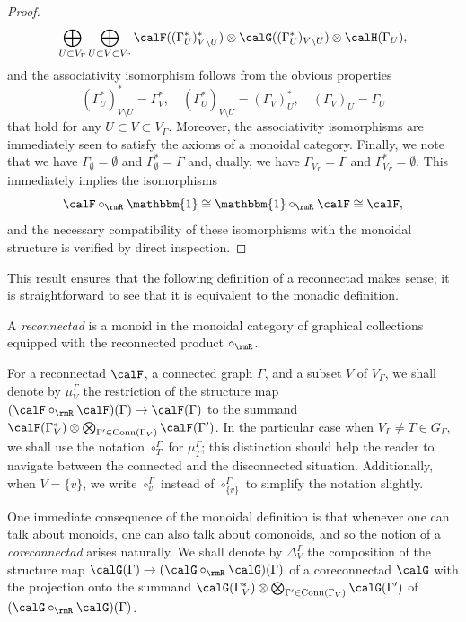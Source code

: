 \begin{proof}
 \[
\bigoplus_{U\subset V_\Gamma}\bigoplus_{U\subset V\subset V_\Gamma}
\calF((\Gamma^*_U)^*_{V\setminus U})\otimes\calG((\Gamma^*_U)_{V\setminus U})\otimes \calH(\Gamma_U), 
 \]
and the associativity isomorphism follows from the obvious properties 
 \[
(\Gamma^*_U)^*_{V\setminus U}=\Gamma^*_V, \quad (\Gamma^*_U)_{V\setminus U}=(\Gamma_V)^*_U, \quad (\Gamma_V)_U=\Gamma_U
 \]
that hold for any $U\subset V\subset V_\Gamma$. Moreover, the associativity isomorphisms are immediately seen to satisfy the axioms of a monoidal category. Finally, we note that we have $\Gamma_\emptyset=\emptyset$ and $\Gamma^*_\emptyset=\Gamma$ and, dually, we have $\Gamma_{V_\Gamma}=\Gamma$ and $\Gamma^*_{V_\Gamma}=\emptyset$. This immediately implies the isomorphisms 
 \[
\calF\circ_{\rmR}\mathbbm{1}\cong\mathbbm{1}\circ_{\rmR}\calF\cong\calF,
 \] 
and the necessary compatibility of these isomorphisms with the monoidal structure is verified by direct inspection. 
\end{proof}

This result ensures that the following definition of a reconnectad makes sense; it is straightforward to see that it is equivalent to the monadic definition.

\begin{defi}
A \emph{reconnectad} is a monoid in the monoidal category of graphical collections equipped with the reconnected product $\circ_{\rmR}$.
\end{defi}

For a reconnectad $\calF$, a connected graph $\Gamma$, and a subset $V$ of $V_\Gamma$, we shall denote by $\mu_V^\Gamma$ the restriction of the structure map $(\calF\circ_{\rmR}\calF)(\Gamma)\to \calF(\Gamma)$ to the summand $\calF(\Gamma^*_V)\otimes\bigotimes_{\Gamma'\in\mathrm{Conn}(\Gamma_V)} \calF(\Gamma')$. In the particular case when $V_\Gamma\ne T\in G_\Gamma$, we shall use the notation $\circ_T^\Gamma$ for $\mu_T^\Gamma$; this distinction should help the reader to navigate between the connected and the disconnected situation. Additionally, when $V=\{v\}$, we write $\circ_v^\Gamma$ instead of $\circ_{\{v\}}^\Gamma$ to simplify the notation slightly. 

One immediate consequence of the monoidal definition is that whenever one can talk about monoids, one can also talk about comonoids, and so the notion of a \emph{coreconnectad} arises naturally. We shall denote by $\Delta_V^\Gamma$ the composition of the structure map $\calG(\Gamma)\to (\calG\circ_{\rmR}\calG)(\Gamma)$ of a coreconnectad $\calG$ with the projection onto the summand $\calG(\Gamma^*_V)\otimes\bigotimes_{\Gamma'\in\mathrm{Conn}(\Gamma_V)} \calG(\Gamma')$ of $(\calG\circ_{\rmR}\calG)(\Gamma)$.

